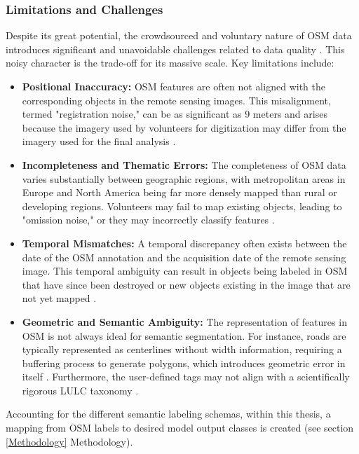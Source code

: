 \documentclass{report}
\begin{document}
\subsubsection{Limitations and Challenges}
\label{sec:osm_limitations_challenges}
Despite its great potential, the crowdsourced and voluntary nature of OSM data introduces significant and unavoidable challenges related to data quality \parencites[p.~3ff.]{UsmaniEtAlRemoteSensingDeepLearningUnderstandNoisyOpenStreetMap2023}. This noisy character is the trade-off for its massive scale. Key limitations include:
\begin{itemize}
\item \textbf{Positional Inaccuracy:} OSM features are often not aligned with the corresponding objects in the remote sensing images. This misalignment, termed "registration noise," can be as significant as 9 meters and arises because the imagery used by volunteers for digitization may differ from the imagery used for the final analysis \parencites[p.~2;]{UsmaniEtAlRemoteSensingDeepLearningUnderstandNoisyOpenStreetMap2023}[p.~1, 3]{KaiserEtAlLearningAerialImageSegmentationOnlineMaps2017}.


    \item \textbf{Incompleteness and Thematic Errors:} The completeness of OSM data varies substantially between geographic regions, with metropolitan areas in Europe and North America being far more densely mapped than rural or developing regions\parencites[p.~4]{DengNewsamQuantitativeComparisonOpenSourceDataFineGrainMappingLandUse2017}. Volunteers may fail to map existing objects, leading to "omission noise," or they may incorrectly classify features \parencites[p.~3]{UsmaniEtAlRemoteSensingDeepLearningUnderstandNoisyOpenStreetMap2023}.
    \item \textbf{Temporal Mismatches:} A temporal discrepancy often exists between the date of the OSM annotation and the acquisition date of the remote sensing image. This temporal ambiguity can result in objects being labeled in OSM that have since been destroyed or new objects existing in the image that are not yet mapped \parencites[p.~1;]{KaiserEtAlLearningAerialImageSegmentationOnlineMaps2017}[p.~3f.]{UsmaniEtAlRemoteSensingDeepLearningUnderstandNoisyOpenStreetMap2023}.
    \item \textbf{Geometric and Semantic Ambiguity:} The representation of features in OSM is not always ideal for semantic segmentation. For instance, roads are typically represented as centerlines without width information, requiring a buffering process to generate polygons, which introduces geometric error in itself \parencites[p.~3]{KaiserEtAlLearningAerialImageSegmentationOnlineMaps2017}. Furthermore, the user-defined tags may not align with a scientifically rigorous LULC taxonomy \parencites[p.~4]{DengNewsamQuantitativeComparisonOpenSourceDataFineGrainMappingLandUse2017}.

\end{itemize}
Accounting for the different semantic labeling schemas, within this thesis, a mapping from OSM labels to desired model output classes is created (see section \ref{Methodology} Methodology).
\end{document}
